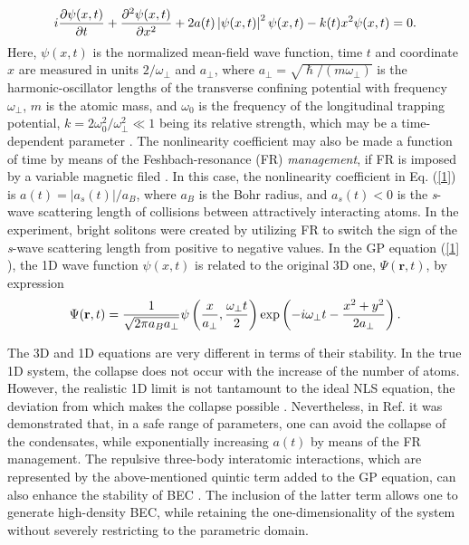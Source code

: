 \documentclass[preprintnumbers]{revtex4}
\begin{document}
\begin{equation}
i\frac{\partial \psi (x,t)}{\partial t}+\frac{\partial ^{2}\psi (x,t)}{%
\partial x^{2}}+2a(t)\left\vert \psi (x,t)\right\vert ^{2}\psi
(x,t)-k(t)x^{2}\psi (x,t)=0.  \label{1}
\end{equation}%
Here, $\psi (x,t)$ is the normalized mean-field wave function, time $t$ and
coordinate $x$ are measured in units $2/\omega _{\bot }$ and $a_{\bot }$,
where $a_{\bot }=\sqrt{\hslash /(m\omega _{\bot })}$ is the
harmonic-oscillator lengths of the transverse confining potential with
frequency $\omega _{\perp }$, $m$ is the atomic mass, and $\omega _{0}$ is
the frequency of the longitudinal trapping potential, $k=2\omega
_{0}^{2}/\omega _{\bot }^{2}\ll 1$ being its relative strength, which may be
a time-dependent parameter \cite{we}. The nonlinearity coefficient may also
be made a function of time by means of the Feshbach-resonance (FR) \textit{%
management}, if FR is imposed by a variable magnetic filed \cite{book}. In
this case, the nonlinearity coefficient in Eq. (\ref{1}) is $a(t)=\left\vert
a_{s}(t)\right\vert /a_{B}$, where $a_{B}$ is the Bohr radius, and $%
a_{s}(t)<0$ is the \textit{s}-wave scattering length of collisions between
attractively interacting atoms. In the experiment, bright solitons were
created by utilizing FR to switch the sign of the \textit{s}-wave scattering
length from positive to negative \cite{8} values. In the GP equation (\ref{1}%
), the 1D wave function $\psi (x,t)$ is related to the original 3D one, $%
\Psi (\mathbf{r},t)$, by expression
\begin{equation}
\Psi (\mathbf{r},t)=\frac{1}{\sqrt{2\pi a_{B}a_{\bot }}}\psi \left( \frac{x}{%
a_{\bot }},\frac{\omega _{\bot }t}{2}\right) \exp \left( -i\omega _{\bot }t-%
\frac{x^{2}+y^{2}}{2a_{\bot }}\right) .
\end{equation}

The 3D and 1D equations are very different in terms of their stability. In
the true 1D system, the collapse does not occur with the increase of the
number of atoms. However, the realistic 1D limit is not tantamount to the
ideal NLS equation, the deviation from which makes the collapse possible
\cite{NJP,breather2}. Nevertheless, in Ref. \cite{7} it was demonstrated
that, in a safe range of parameters, one can avoid the collapse of the
condensates, while exponentially increasing $a(t)$ by means of the FR
management. The repulsive three-body interatomic interactions, which are
represented by the above-mentioned quintic term added to the GP equation,
can also enhance the stability of BEC \cite{20,quintic,17}. The inclusion of
the latter term allows one to generate high-density BEC, while retaining the
one-dimensionality of the system without severely restricting to the
parametric domain.
\end{document}
